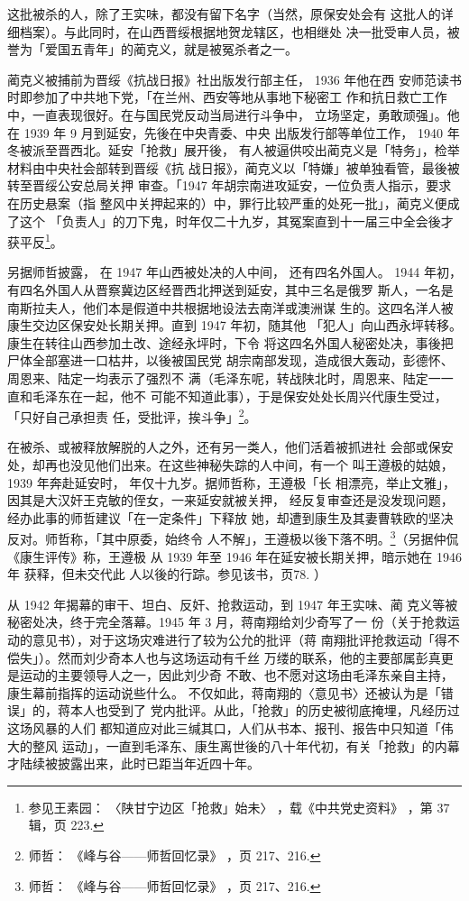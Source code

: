 这批被杀的人，除了王实味，都没有留下名字（当然，原保安处会有
这批人的详细档案）。与此同时，在山西晋绥根据地贺龙辖区，也相继处
决一批受审人员，被誉为「爱国五青年」的蔺克义，就是被冤杀者之一。

蔺克义被捕前为晋绥《抗战日报》社出版发行部主任， 1936 年他在西
安师范读书时即参加了中共地下党，「在兰州、西安等地从事地下秘密工
作和抗日救亡工作中，一直表现很好。在与国民党反动当局进行斗争中，
立场坚定，勇敢顽强」。他在 1939 年 9 月到延安，先後在中央青委、中央
出版发行部等单位工作， 1940 年冬被派至晋西北。延安「抢救」展开後，
有人被逼供咬出蔺克义是「特务」，检举材料由中央社会部转到晋绥《抗
战日报》，蔺克义以「特嫌」被单独看管，最後被转至晋绥公安总局关押
审查。「1947 年胡宗南进攻延安，一位负责人指示，要求在历史悬案（指
整风中关押起来的）中，罪行比较严重的处死一批」，蔺克义便成了这个
「负责人」的刀下鬼，时年仅二十九岁，其冤案直到十一届三中全会後才
获平反\footnote{参见王素园：
〈陕甘宁边区「抢救」始未〉
，载《中共党史资料》
，第 37 辑，页 223.}。

另据师哲披露，
在 1947 年山西被处决的人中间，
还有四名外国人。
1944
年初，有四名外国人从晋察冀边区经晋西北押送到延安，其中三名是俄罗
斯人，一名是南斯拉夫人，他们本是假道中共根据地设法去南洋或澳洲谋
生的。这四名洋人被康生交边区保安处长期关押。直到 1947 年初，随其他
「犯人」向山西永坪转移。康生在转往山西参加土改、途经永坪时，下令
将这四名外国人秘密处决，事後把尸体全部塞进一口枯井，以後被国民党
胡宗南部发现，造成很大轰动，彭德怀、周恩来、陆定一均表示了强烈不
满（毛泽东呢，转战陕北时，周恩来、陆定一一直和毛泽东在一起，他不
可能不知道此事），于是保安处处长周兴代康生受过，「只好自己承担责
任，受批评，挨斗争」\footnote{师哲：
《峰与谷——师哲回忆录》
，页 217、216.}。

在被杀、或被释放解脱的人之外，还有另一类人，他们活着被抓进社
会部或保安处，却再也没见他们出来。在这些神秘失踪的人中间，有一个
叫王遵极的姑娘， 1939 年奔赴延安时，
年仅十九岁。据师哲称，王遵极「长
相漂亮，举止文雅」，因其是大汉奸王克敏的侄女，一来延安就被关押，
经反复审查还是没发现问题，经办此事的师哲建议「在一定条件」下释放
她，却遭到康生及其妻曹轶欧的坚决反对。师哲称，「其中原委，始终令
人不解」，王遵极以後下落不明。\footnote{师哲：
《峰与谷——师哲回忆录》
，页 217、216.}（另据仲侃《康生评传》称，王遵极
从 1939 年至 1946 年在延安被长期关押，暗示她在 1946 年 获释，但未交代此
人以後的行踪。参见该书，页78. ）

从 1942 年揭幕的审干、坦白、反奸、抢救运动，到 1947 年王实味、蔺
克义等被秘密处决，终于完全落幕。1945 年 3 月，蒋南翔给刘少奇写了一
份（关于抢救运动的意见书），对于这场灾难进行了较为公允的批评（蒋
南翔批评抢救运动「得不偿失」）。然而刘少奇本人也与这场运动有千丝
万缕的联系，他的主要部属彭真更是运动的主要领导人之一，因此刘少奇
不敢、也不愿对这场由毛泽东亲自主持，康生幕前指挥的运动说些什么。
不仅如此，蒋南翔的〈意见书〉还被认为是「错误」的，蒋本人也受到了
党内批评。从此，「抢救」的历史被彻底掩埋，凡经历过这场风暴的人们
都知道应对此三缄其口，人们从书本、报刊、报告中只知道「伟大的整风
运动」，一直到毛泽东、康生离世後的八十年代初，有关「抢救」的内幕
才陆续被披露出来，此时已距当年近四十年。
